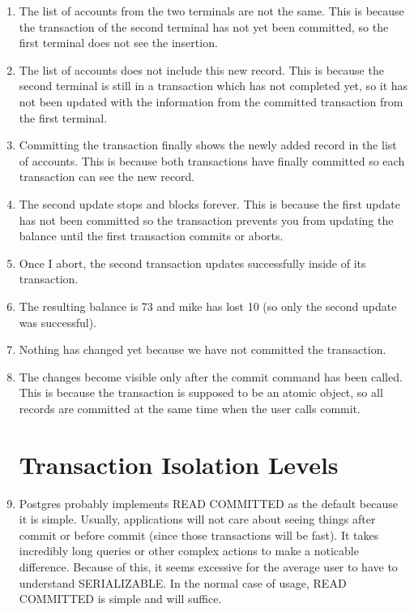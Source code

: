 \documentclass[psamsfonts]{amsart}
\begin{document}
\begin{enumerate}
  \item The list of accounts from the two terminals are not the same. This is because the transaction of the second terminal has not yet been committed, so the first terminal does not see the insertion.
  \item The list of accounts does not include this new record. This is because the second terminal is still in a transaction which has not completed yet, so it has not been updated with the information from the committed transaction from the first terminal.
  \item Committing the transaction finally shows the newly added record in the list of accounts. This is because both transactions have finally committed so each transaction can see the new record.
  \item The second update stops and blocks forever. This is because the first update has not been committed so the transaction prevents you from updating the balance until the first transaction commits or aborts.
  \item Once I abort, the second transaction updates successfully inside of its transaction.
  \item The resulting balance is 73 and mike has lost 10 (so only the second update was successful).
  \item Nothing has changed yet because we have not committed the transaction.
  \item The changes become visible only after the commit command has been called. This is because the transaction is supposed to be an atomic object, so all records are committed at the same time when the user calls commit.

    \section{Transaction Isolation Levels}

  \item Postgres probably implements READ COMMITTED as the default because it is simple. Usually, applications will not care about seeing things after commit or before commit (since those transactions will be fast). It takes incredibly long queries or other complex actions to make a noticable difference. Because of this, it seems excessive for the average user to have to understand SERIALIZABLE. In the normal case of usage, READ COMMITTED is simple and will suffice.
\end{enumerate}
\end{document}
